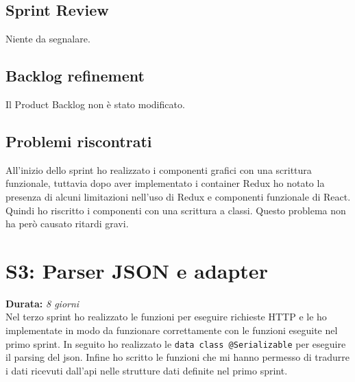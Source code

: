 \subsection{Sprint Review}
Niente da segnalare.

\subsection{Backlog refinement}
Il Product Backlog non è stato modificato.

\subsection{Problemi riscontrati}
All'inizio dello sprint ho realizzato i componenti grafici con una scrittura funzionale, tuttavia dopo aver implementato i container Redux ho notato la presenza di alcuni limitazioni nell'uso di Redux e componenti funzionale di React. Quindi ho riscritto i componenti con una scrittura a classi. Questo problema non ha però causato ritardi gravi. 

\newpage

\section{S3: Parser JSON e adapter}
\textbf{Durata:} \textit{8 giorni} \\
Nel terzo sprint ho realizzato le funzioni per eseguire richieste HTTP e le ho implementate in modo da funzionare correttamente con le funzioni eseguite nel primo sprint. In seguito ho realizzato le \verb|data class @Serializable| per eseguire il parsing del json. Infine ho scritto le funzioni che mi hanno permesso di tradurre i dati ricevuti dall'api nelle strutture dati definite nel primo sprint.
 
